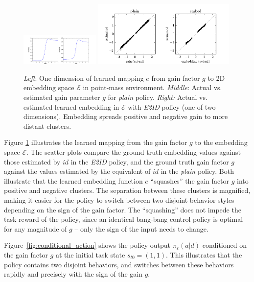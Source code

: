 \documentclass{article}
\newcommand{\plain}{\emph{plain}}
\newcommand{\embed}{\emph{E2ID}}
\newcommand{\embedfn}{e}
\newcommand{\idfn}{id}
\newcommand{\idvar}{d}
\newcommand{\latset}{\mathcal{E}}
\newcommand{\latvar}{\varepsilon}
\newcommand{\figref}[1]{Figure \ref{#1}}
\begin{document}
\begin{figure}
\centering
\includegraphics[trim={13.7cm 0 2cm 0}, clip, width=0.35\textwidth]{pointmass_embed_mapping.pdf}
\includegraphics[trim={0.5cm 0 1cm 0}, clip, width=0.63\textwidth]{pointmass_embed_scatter.pdf}
\caption{
\emph{Left}: One dimension of learned mapping $\embedfn$ from gain factor $g$ to 2D embedding space $\latset$ in point-mass environment.
\emph{Middle}: Actual vs. estimated gain parameter $g$ for \plain{} policy.
\emph{Right:} Actual vs. estimated learned embedding in $\latset$ with \embed{} policy (one of two dimensions).
Embedding spreads positive and negative gain to more distant clusters.
}
\label{embed-mapping}
\end{figure}


\figref{embed-mapping} illustrates the learned mapping from the gain factor $g$
to the embedding space $\latset$.
The scatter plots compare the ground truth embedding values
against those estimated by $\idfn$ in the \embed{} policy,
and the ground truth gain factor $g$ against the values estimated by the equivalent of $\idfn$ in the \plain{} policy.
Both illustrate that the learned embedding function $\embedfn$ ``squashes'' the gain factor $g$ into positive and negative clusters.
The separation between these clusters is magnified, making it easier for the policy to switch between two disjoint behavior styles depending on the sign of the gain factor.
The ``squashing'' does not impede the task reward of the policy,
since an identical bang-bang control policy is optimal for any magnitude of $g$ -- only the sign of the input needs to change.

Figure~\ref{fig:conditional_action} shows the policy output $\pi_\latvar(a|\idvar)$ conditioned on
the gain factor $g$ at the initial task state $s_{t0} = (1, 1)$.
This illustrates that the policy contains two disjoint behaviors,
and switches between these behaviors rapidly and precisely with the sign of the gain $g$.
\end{document}
